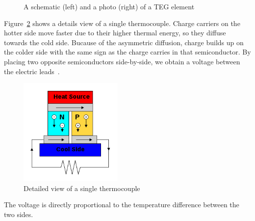 \documentclass[a4paper,10pt]{article}
\begin{document}
\begin{figure}[h]
\caption{A schematic (left) and a photo (right) of a \ac{TEG} element~\cite{Salerno10,wiki:teg}}
\label{fig:teg-schematic}
\end{figure}

Figure~\ref{fig:teg-couple} shows a details view of a single thermocouple. Charge carriers on the hotter side move faster due to their higher thermal energy, so they diffuse towards the cold side. Bucause of the asymmetric diffusion, charge builds up on the colder side with the same sign as the charge carries in that semiconductor. By placing two opposite semiconductors side-by-side, we obtain a voltage between the electric leads~\cite{wiki:thermo}. 

\begin{figure}[h]
\centering
\includegraphics[height=150pt]{./Slike/TEG-couple}
 \caption{Detailed view of a single thermocouple~\cite{wiki:thermo}}
\label{fig:teg-couple}
\end{figure}

The voltage is directly proportional to the temperature difference between the two sides. 
\end{document}
